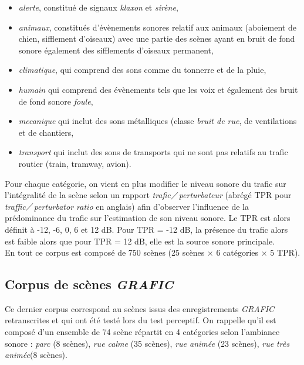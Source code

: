 \begin{itemize}
\item \textit{alerte}, constitué de signaux \textit{klaxon} et \textit{sirène},
\item \textit{animaux}, constitués d'évènements sonores relatif aux animaux (aboiement de chien, sifflement d'oiseaux) avec une partie des scènes ayant en bruit de fond sonore également des sifflements d'oiseaux permanent,
\item \textit{climatique}, qui comprend des sons comme du tonnerre et de la pluie,
\item \textit{humain} qui comprend des évènements tels que les voix et également des bruit de fond sonore \textit{foule}, 
\item \textit{mecanique} qui inclut des sons métalliques (classe \textit{bruit de rue}, de ventilations et de chantiers,
\item \textit{transport} qui inclut des sons de transports qui ne sont pas relatifs au trafic routier (train, tramway, avion).\\
\end{itemize}

Pour chaque catégorie, on vient en plus modifier le niveau sonore du trafic sur l'intégralité de la scène selon un rapport \og \textit{trafic}$\diagup$\textit{perturbateur}\fg{} (abrégé TPR pour \textit{traffic}$\diagup$\textit{perturbator ratio} en anglais) afin d'observer l'influence de la prédominance du trafic sur l'estimation de son niveau sonore. Le TPR est alors définit à -12, -6, 0, 6 et 12 dB. Pour TPR = -12 dB, la présence du trafic alors est faible alors que pour TPR = 12 dB, elle est la source sonore principale.\\

En tout ce corpus est composé de 750 scènes (25 scènes $\times$ 6 catégories $\times$ 5 TPR).

\subsection{Corpus de scènes \textit{GRAFIC}} 

Ce dernier corpus correspond au scènes issus des enregistrements \textit{GRAFIC} retranscrites et qui ont été testé lors du test perceptif. On rappelle qu'il est composé d'un ensemble de 74 scène répartit en 4 catégories selon l'ambiance sonore : \textit{parc} (8 scènes), \textit{rue calme} (35 scènes), \textit{rue animée} (23 scènes), \textit{rue très animée}(8 scènes). 

